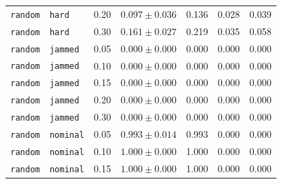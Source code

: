 \documentclass{article}
\begin{document}
\begin{center}
\begin{tabular}{lllcccc}
\texttt{random} & \texttt{hard} & 0.20 & $0.097 \pm 0.036$ & 0.136 & 0.028 & 0.039 \\
\texttt{random} & \texttt{hard} & 0.30 & $0.161 \pm 0.027$ & 0.219 & 0.035 & 0.058 \\
\texttt{random} & \texttt{jammed} & 0.05 & $0.000 \pm 0.000$ & 0.000 & 0.000 & 0.000 \\
\texttt{random} & \texttt{jammed} & 0.10 & $0.000 \pm 0.000$ & 0.000 & 0.000 & 0.000 \\
\texttt{random} & \texttt{jammed} & 0.15 & $0.000 \pm 0.000$ & 0.000 & 0.000 & 0.000 \\
\texttt{random} & \texttt{jammed} & 0.20 & $0.000 \pm 0.000$ & 0.000 & 0.000 & 0.000 \\
\texttt{random} & \texttt{jammed} & 0.30 & $0.000 \pm 0.000$ & 0.000 & 0.000 & 0.000 \\
\texttt{random} & \texttt{nominal} & 0.05 & $0.993 \pm 0.014$ & 0.993 & 0.000 & 0.000 \\
\texttt{random} & \texttt{nominal} & 0.10 & $1.000 \pm 0.000$ & 1.000 & 0.000 & 0.000 \\
\texttt{random} & \texttt{nominal} & 0.15 & $1.000 \pm 0.000$ & 1.000 & 0.000 & 0.000 \\
\bottomrule
\end{tabular}
\end{center}
\end{document}
